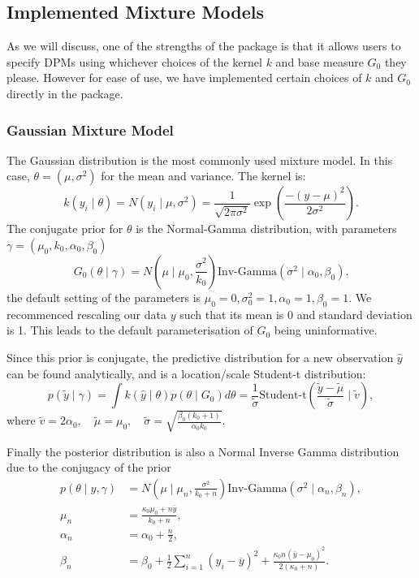 \documentclass[nojss]{jss}
\begin{document}
\subsection{Implemented Mixture Models} \label{subsec:implemented}
As we will discuss, one of the strengths of the  package is that it allows users to specify DPMs using whichever choices of the kernel $k$ and base measure $G_0$ they please. However for ease of use, we have implemented certain choices of $k$ and $G_0$ directly in the package.

\subsubsection{Gaussian Mixture Model}
The Gaussian distribution is the most commonly used mixture model. In this case, $\theta = (\mu,\sigma^2)$ for the mean and variance. The kernel is:
\begin{equation}
k(y_i \mid \theta) = N(y_i \mid \mu, \sigma^2) = \frac{1}{\sqrt{2\pi \sigma^2}} \exp \left( \frac{ -(y-\mu)^2}{2\sigma^2} \right).
\end{equation}
The conjugate prior for $\theta$ is the Normal-Gamma distribution, with parameters $\gamma = (\mu_0, k_0, \alpha_0, \beta_0)$
\begin{equation}
G_0(\theta \mid \gamma) =  N\left(\mu \mid \mu_0, \frac{\sigma^2}{k_0} \right) \text{Inv-Gamma} \left(\sigma^2 \mid \alpha_0, \beta_0 \right).
\end{equation}
the default setting of the parameters is $\mu_0 = 0, \sigma _0 ^2 = 1, \alpha _0 = 1, \beta _0 = 1$.
We recommenced rescaling our data $y$ such that its mean is 0 and standard deviation is 1. This leads to the default parameterisation of $G_0$ being uninformative.

Since this prior is conjugate, the predictive distribution for a new observation $\hat{y}$ can be found analytically, and is a location/scale Student-t distribution:
\begin{equation}
p(\tilde{y} \mid \gamma) = \int k(\hat{y}\mid\theta) p(\theta \mid G_0) d\theta = \frac{1}{\tilde{\sigma}} \text{Student-t} \left( \frac{ \tilde{y} - \tilde{\mu}}{\tilde{\sigma}} \mid \tilde{v}\right),
\end{equation}
where $\tilde{v} = 2 \alpha_0, \quad \tilde{\mu} = \mu_0, \quad \tilde{\sigma} = \sqrt{ \frac{\beta_0 (k_0 + 1)}{\alpha_0 k_0}}$.

Finally the posterior distribution is also a Normal Inverse Gamma distribution due to the conjugacy of the prior
\begin{align*}
p(\theta \mid y, \gamma) & = N ( \mu \mid \mu _n , \frac{\sigma ^2}{k_0 + n}  ) \text{Inv-Gamma} ( \sigma ^2 \mid \alpha _n , \beta _n), \\
\mu _n & = \frac{\kappa _0 \mu _0 + n \overline{y}}{k_0 + n}, \\
\alpha _n & = \alpha _0 + \frac{n}{2}, \\
\beta _n & = \beta _0 + \frac{1}{2} \sum _{i=1} ^n (y_i - \overline{y} ) ^2 + \frac{\kappa _0 n (\overline{y} - \mu _0)^2}{2(\kappa _0 + n)} .
\end{align*}
\end{document}
